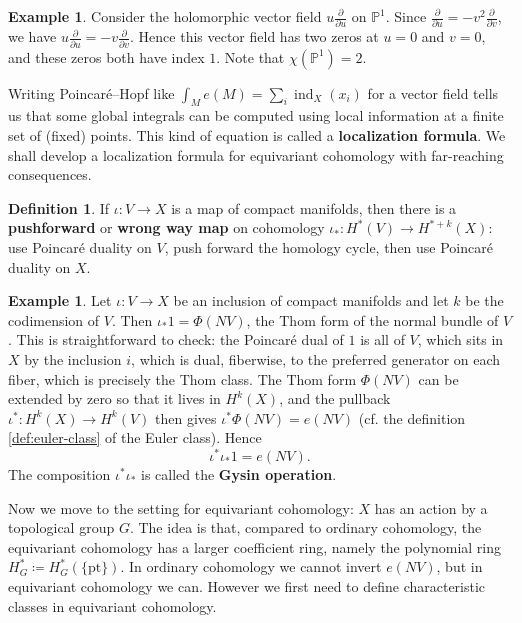 \documentclass{report}
\theoremstyle{plain}
\theoremstyle{definition}
\newtheorem{definition}[theorem]{Definition}
\newtheorem{example}[theorem]{Example}
\theoremstyle{remark}
\newcommand{\bP}{\mathbb{P}}
\DeclareMathOperator{\ind}{ind}
\newcommand{\pt}{\mathrm{pt}}
\newcommand{\pder}[2]{\frac{\partial #1}{\partial #2}}
\begin{document}
\begin{example}
  Consider the holomorphic vector field $u \pder{}{u}$ on $\bP^1$.
  Since $\pder{}{u} = -v^2 \pder{}{v}$, we have $u \pder{}{u} = -v
  \pder{}{v}$. Hence this vector field has two zeros at $u = 0$ and $v
  = 0$, and these zeros both have index $1$. Note that $\chi(\bP^1) =
  2$.
\end{example}

Writing Poincar\'e--Hopf like $\int_M e(M) = \sum_i \ind_X(x_i)$ for a
vector field tells us that some global integrals can be computed using
local information at a finite set of (fixed) points. This kind of
equation is called a {\bf localization formula}. We shall develop a
localization formula for equivariant cohomology with far-reaching
consequences.

\begin{definition}
  If $\iota\colon V \to X$ is a map of compact manifolds, then there
  is a {\bf pushforward} or {\bf wrong way map} on cohomology
  $\iota_*\colon H^*(V) \to H^{*+k}(X)$: use Poincar\'e duality on
  $V$, push forward the homology cycle, then use Poincar\'e duality on
  $X$.
\end{definition}

\begin{example}
  Let $\iota\colon V \to X$ be an inclusion of compact manifolds and
  let $k$ be the codimension of $V$. Then $\iota_*1 = \Phi(NV)$, the
  Thom form of the normal bundle of $V$. This is straightforward to
  check: the Poincar\'e dual of $1$ is all of $V$, which sits in $X$
  by the inclusion $i$, which is dual, fiberwise, to the preferred
  generator on each fiber, which is precisely the Thom class. The Thom
  form $\Phi(NV)$ can be extended by zero so that it lives in
  $H^k(X)$, and the pullback $\iota^*\colon H^k(X) \to H^k(V)$ then
  gives $\iota^*\Phi(NV) = e(NV)$ (cf. the definition
  \ref{def:euler-class} of the Euler class). Hence
  \begin{equation} \label{eq:gysin-operation}
    \iota^* \iota_* 1 = e(NV).
  \end{equation}
  The composition $\iota^*\iota_*$ is called the {\bf Gysin operation}.
\end{example}

Now we move to the setting for equivariant cohomology: $X$ has an
action by a topological group $G$. The idea is that, compared to
ordinary cohomology, the equivariant cohomology has a larger
coefficient ring, namely the polynomial ring $H^*_G \coloneqq
H^*_G(\{\pt\})$. In ordinary cohomology we cannot invert $e(NV)$, but
in equivariant cohomology we can. However we first need to define
characteristic classes in equivariant cohomology.
\end{document}
